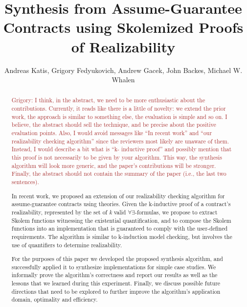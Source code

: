 \documentclass[orivec]{llncs}
\newcommand{\grigory}[1]{\textcolor{brown}{Grigory: #1}}
\begin{document}
\title{Synthesis from Assume-Guarantee Contracts using Skolemized Proofs of
Realizability}
\author{Andreas Katis, Grigory Fedyukovich, Andrew
Gacek, John Backes, Michael W. Whalen}%
\maketitle

\begin{abstract}
\grigory{I think, in the abstract, we need to be more enthusiastic about the contributions.
Currently, it reads like there is a little of novelty: we extend the prior work, the approach is similar to something else, the evaluation is simple and so on.
I believe, the abstract should sell the technique, and be precise about the positive evaluation points.
Also, I would avoid messages like ``In recent work'' and ``our realizability checking algorithm''
since the reviewers most likely are unaware of them.
Instead, I would describe a bit what is ``k- inductive proof'' and possibly mention that this proof 
is not necessarily to be given by your algorithm. This way, the synthesis algorithm 
will look more generic, and the paper's contributions will be stronger.
Finally, the abstract should not contain the summary of the paper (i.e., the last two sentences).}

In recent work, we proposed an extension of our realizability checking algorithm
for assume-guarantee contracts using theories. Given the k-inductive proof of a
contract's realizability, represented by the set of \textit{k} valid $\forall\exists$-formulas, we propose
to extract Skolem functions witnessing the existential quantification, and to compose the Skolem functions into 
an implementation that is guaranteed to comply with the user-defined requirements.
The algorithm is similar to k-induction model checking, but involves the use of 
quantifiers to determine realizability.

For the purposes of this paper we developed the proposed synthesis algorithm,
and successfully applied it to synthesize implementations for simple case
studies. We informally prove the algorithm's correctness and report our results
as well as the lessons that we learned during this experiment. Finally, we
discuss possible future directions that need to be explored to further improve the algorithm's application domain, optimality and efficiency.
\end{abstract}
\end{document}
